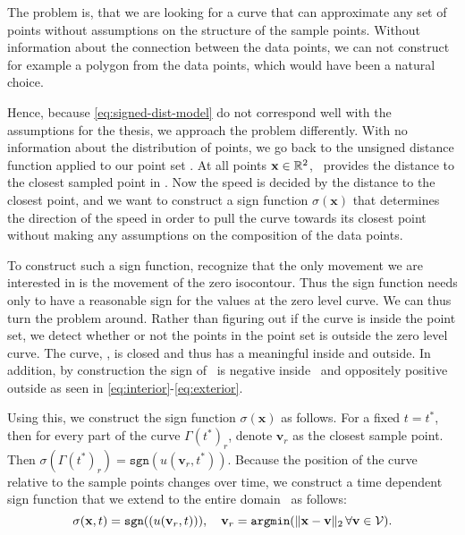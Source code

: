 The problem is, that we are looking for a curve that can approximate any set of points without assumptions on the structure of the sample points. Without information about the connection between the data points, we can not construct for example a polygon from the data points, which would have been a natural choice. 

Hence, because \eqref{eq:signed-dist-model} do not correspond well with the assumptions for the thesis, we approach the problem differently. With no information about the distribution of points, we go back to the unsigned distance function applied to our point set \distanceV. At all points $\mathbf{x}\in\mathbb{R}^2$, \distanceV\ provides the distance to the closest sampled point in \pointset. Now the speed is decided by the distance to the closest point, and we want to construct a sign function $\sigma(\mathbf{x})$ that determines the direction of the speed in order to pull the curve towards its closest point without making any assumptions on the composition of the data points.

To construct such a sign function, recognize that the only movement we are interested in is the movement of the zero isocontour. Thus the sign function needs only to have a reasonable sign for the values at the zero level curve. We can thus turn the problem around. Rather than figuring out if the curve is inside the point set, we detect whether or not the points in the point set is outside the zero level curve. The curve, \curve, is closed and thus has a meaningful inside and outside. In addition, by construction the sign of \uxt\ is negative inside \curve\ and oppositely positive outside as seen in \eqref{eq:interior}-\eqref{eq:exterior}. 

Using this, we construct the sign function $\sigma(\mathbf{x})$ as follows. For a fixed $t=t^*$, then for every part of the curve $\Gamma(t^*)_r$, denote $\mathbf{v}_r$ as the closest sample point. Then $\sigma(\Gamma(t^*)_r) = \texttt{sgn}(u(\mathbf{v}_r, t^*))$. Because the position of the curve relative to the sample points changes over time, we construct a time dependent sign function that we extend to the entire domain \domain\ as follows:
\begin{equation}
    \sigma(\mathbf{x}, t) = \texttt{sgn}((u(\mathbf{v}_r, t))), \quad \mathbf{v}_r = \texttt{argmin}(\|\mathbf{x}- \mathbf{v}\|_2 \, \forall \mathbf{v} \in \mathcal{V}). 
    \label{eq:sigma-def}
\end{equation}

